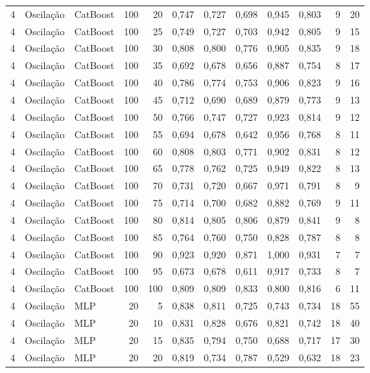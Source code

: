 \begin{longtable}{@{}rllrrrrrrrrr@{}}
4 & Oscilação & CatBoost & 100 & 20 & 0,747 & 0,727 & 0,698 & 0,945 & 0,803 & 9 & 20 \\
4 & Oscilação & CatBoost & 100 & 25 & 0,749 & 0,727 & 0,703 & 0,942 & 0,805 & 9 & 15 \\
4 & Oscilação & CatBoost & 100 & 30 & 0,808 & 0,800 & 0,776 & 0,905 & 0,835 & 9 & 18 \\
4 & Oscilação & CatBoost & 100 & 35 & 0,692 & 0,678 & 0,656 & 0,887 & 0,754 & 8 & 17 \\
4 & Oscilação & CatBoost & 100 & 40 & 0,786 & 0,774 & 0,753 & 0,906 & 0,823 & 9 & 16 \\
4 & Oscilação & CatBoost & 100 & 45 & 0,712 & 0,690 & 0,689 & 0,879 & 0,773 & 9 & 13 \\
4 & Oscilação & CatBoost & 100 & 50 & 0,766 & 0,747 & 0,727 & 0,923 & 0,814 & 9 & 12 \\
4 & Oscilação & CatBoost & 100 & 55 & 0,694 & 0,678 & 0,642 & 0,956 & 0,768 & 8 & 11 \\
4 & Oscilação & CatBoost & 100 & 60 & 0,808 & 0,803 & 0,771 & 0,902 & 0,831 & 8 & 12 \\
4 & Oscilação & CatBoost & 100 & 65 & 0,778 & 0,762 & 0,725 & 0,949 & 0,822 & 8 & 13 \\
4 & Oscilação & CatBoost & 100 & 70 & 0,731 & 0,720 & 0,667 & 0,971 & 0,791 & 8 & 9 \\
4 & Oscilação & CatBoost & 100 & 75 & 0,714 & 0,700 & 0,682 & 0,882 & 0,769 & 9 & 11 \\
4 & Oscilação & CatBoost & 100 & 80 & 0,814 & 0,805 & 0,806 & 0,879 & 0,841 & 9 & 8 \\
4 & Oscilação & CatBoost & 100 & 85 & 0,764 & 0,760 & 0,750 & 0,828 & 0,787 & 8 & 8 \\
4 & Oscilação & CatBoost & 100 & 90 & 0,923 & 0,920 & 0,871 & 1,000 & 0,931 & 7 & 7 \\
4 & Oscilação & CatBoost & 100 & 95 & 0,673 & 0,678 & 0,611 & 0,917 & 0,733 & 8 & 7 \\
4 & Oscilação & CatBoost & 100 & 100 & 0,809 & 0,809 & 0,833 & 0,800 & 0,816 & 6 & 11 \\
4 & Oscilação & MLP & 20 & 5 & 0,838 & 0,811 & 0,725 & 0,743 & 0,734 & 18 & 55 \\
4 & Oscilação & MLP & 20 & 10 & 0,831 & 0,828 & 0,676 & 0,821 & 0,742 & 18 & 40 \\
4 & Oscilação & MLP & 20 & 15 & 0,835 & 0,794 & 0,750 & 0,688 & 0,717 & 17 & 30 \\
4 & Oscilação & MLP & 20 & 20 & 0,819 & 0,734 & 0,787 & 0,529 & 0,632 & 18 & 23 \\

\end{longtable}
